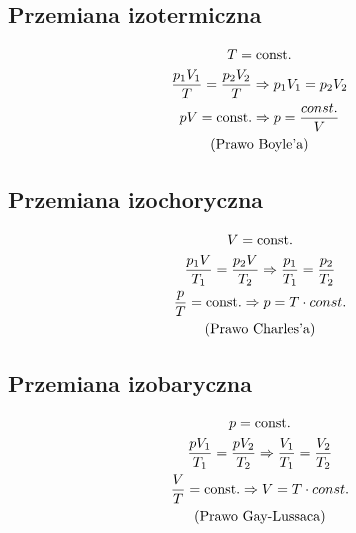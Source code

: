     \subsection{Przemiana izotermiczna}
      \begin{gather}
        T = \operatorname{const.}\\
        \frac{p_1V_1}{T} = \frac{p_2V_2}{T} \Rightarrow p_1V_1 = p_2V_2\\
        pV = \operatorname{const.} \Rightarrow p = \frac{const.}{V}\\
        \text{(Prawo Boyle'a)}
      \end{gather}
    \subsection{Przemiana izochoryczna}
      \begin{gather}
        V = \operatorname{const.}\\
        \frac{p_1V}{T_1} = \frac{p_2V}{T_2} \Rightarrow \frac{p_1}{T_1} = \frac{p_2}{T_2}\\
        \frac{p}{T} = \operatorname{const.} \Rightarrow p = T\cdot const.\\\text{(Prawo Charles'a)}
      \end{gather}

    \subsection{Przemiana izobaryczna}
      \begin{gather}
        p = \operatorname{const.}\\
        \frac{pV_1}{T_1} = \frac{pV_2}{T_2} \Rightarrow \frac{V_1}{T_1} = \frac{V_2}{T_2}\\
        \frac{V}{T} = \operatorname{const.} \Rightarrow V = T\cdot const.\\
        \text{(Prawo Gay-Lussaca)}
      \end{gather}
